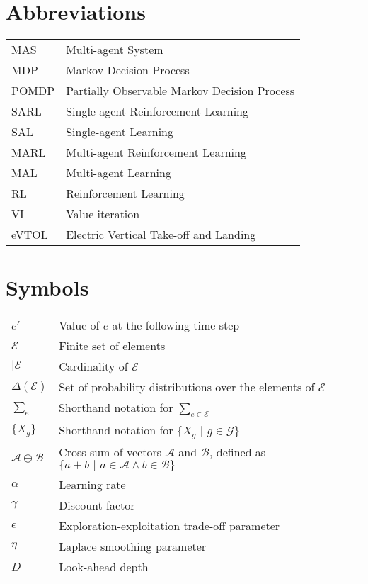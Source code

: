\documentclass[master=ecws,masteroption=ai,acyear=2019 -- 2020]{kulemt}
\theoremstyle{plain}
\theoremstyle{plain}
\theoremstyle{remark}
\begin{document}
\section*{Abbreviations}
\begin{flushleft}
  \renewcommand{\arraystretch}{1.1}
  \begin{tabularx}{\textwidth}{@{}p{12mm}X@{}}
    MAS   & Multi-agent System \\
    MDP   & Markov Decision Process \\
    POMDP  & Partially Observable Markov Decision Process \\
    SARL  & Single-agent Reinforcement Learning \\
    SAL  & Single-agent Learning \\
    MARL  & Multi-agent Reinforcement Learning \\
    MAL  & Multi-agent Learning \\
    RL  & Reinforcement Learning \\
    VI  & Value iteration \\
    eVTOL  & Electric Vertical Take-off and Landing \\
  \end{tabularx}
\end{flushleft}
\section*{Symbols}
\begin{flushleft}
  \renewcommand{\arraystretch}{1.1}
  \begin{tabularx}{\textwidth}{@{}p{12mm}X@{}}
    $e'$    & Value of $e$ at the following time-step \\
    $\mathcal{E}$   & Finite set of elements \\
    $\lvert \mathcal{E} \rvert$   & Cardinality of $\mathcal{E}$ \\
    $\Delta (\mathcal{E})$   & Set of probability distributions over the elements of $\mathcal{E}$ \\
    $\sum_{e}$ & Shorthand notation for $\sum_{e \in \mathcal{E}}$ \\
    $\{X_g\}$ & Shorthand notation for $\{X_g \,\,\lvert\,\, g \in \mathcal{G}\}$ \\
    $\mathcal{A} \oplus \mathcal{B}$ & Cross-sum of vectors $\mathcal{A}$ and $\mathcal{B}$, defined as $\{ a + b \,\,\lvert \,\, a \in \mathcal{A} \land b \in \mathcal{B} \}$ \\
    $\alpha$ & Learning rate\\
    $\gamma$ & Discount factor \\
    $\epsilon$ & Exploration-exploitation trade-off parameter \\
    $\eta$ & Laplace smoothing parameter\\
    $D$ & Look-ahead depth \\
    
  \end{tabularx}
\end{flushleft}
\end{document}
